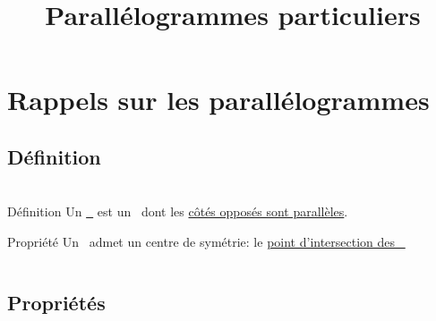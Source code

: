 \documentclass{beamer}
\title{Parallélogrammes particuliers}
\author{}\institute{}
\begin{document}
	
	
	
\begin{frame}
	\titlepage
\end{frame}

\section{Rappels sur les parallélogrammes}

\subsection{Définition}

\begin{frame}
\frametitle{ }  
\framesubtitle{ }	

\begin{columns}[onlytextwidth]
	\begin{column}{0.465\textwidth}
		\begin{exampleblock}{Définition}
			Un \textbf{\underline{\para\ }} est un \myquad\ dont les \underline{côtés opposés sont parallèles}.
		\end{exampleblock}	
		
		\begin{alertblock}{Propriété}
			Un \para\ admet un centre de symétrie: le \underline{point d'intersection des \diags\ }
		\end{alertblock}		
	\end{column}
	\begin{column}{0.465\textwidth}
	\end{column}
\end{columns}


\end{frame}


\subsection{Propriétés}
\end{document}
